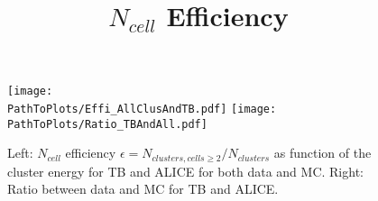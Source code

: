 \documentclass[ALICE]{ALICE_analysis_notes}
\newcommand{\PathToPlots}{/home/joshua/PCG_Software/EMCal_NCellEffi/13TeVNomB_Wide/Pi0Tagging_13TeV_nom_04_26_WithTRD_WithBorderCells_1cellFT/pdf}
\begin{document}
\title{$N_{cell}$ Efficiency}





%







\begin{figure}[b]
	\centering
	\texttt{[image: \\PathToPlots/Effi\_AllClusAndTB.pdf]}
	\texttt{[image: \\PathToPlots/Ratio\_TBAndAll.pdf]}
	\caption{Left: $N_{cell}$ efficiency $\epsilon = N_{clusters, cells \geq 2} / N_{clusters}$ as function of the cluster energy for TB and ALICE for both data and MC. Right: Ratio between data and MC for TB and ALICE. }
	\label{fig:NCells_Cor}
\end{figure}
\end{document}
